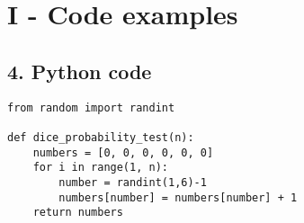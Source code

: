 \documentclass[12pt, oneside]{article}
\begin{document}
\pagebreak
\section*{I - Code examples}

\subsection*{4. Python code} 

\begin{verbatim}
from random import randint

def dice_probability_test(n):
	numbers = [0, 0, 0, 0, 0, 0]
	for i in range(1, n):
		number = randint(1,6)-1
		numbers[number] = numbers[number] + 1
	return numbers
\end{verbatim}
\end{document}
